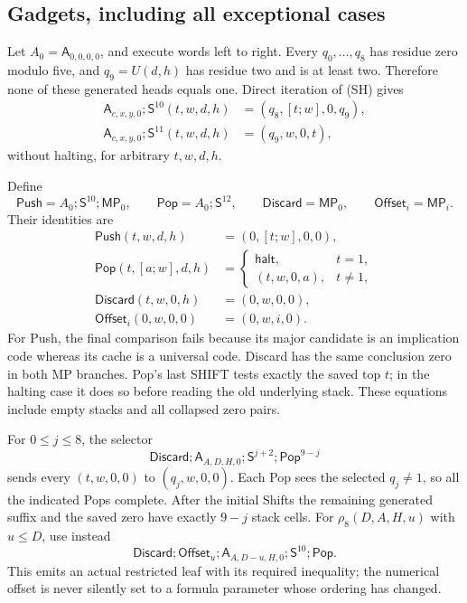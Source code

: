 \subsection{Gadgets, including all exceptional cases}

Let $A_0=\mathsf A_{0,0,0,0}$, and execute words left to right.
Every $q_0,\ldots,q_8$ has residue zero modulo five, and
$q_9=U(d,h)$ has residue two and is at least two.  Therefore none of
these generated heads equals one.  Direct iteration of (SH) gives
\begin{align*}
 \mathsf A_{c,x,y,0};\mathsf S^{10}(t,w,d,h)
     &=(q_8,[t;w],0,q_9),\\
 \mathsf A_{c,x,y,0};\mathsf S^{11}(t,w,d,h)
     &=(q_9,w,0,t),
\end{align*}
without halting, for arbitrary $t,w,d,h$.

Define
\[
 \mathsf{Push}=A_0;\mathsf S^{10};\mathsf{MP}_0,
 \qquad \mathsf{Pop}=A_0;\mathsf S^{12},
 \qquad \mathsf{Discard}=\mathsf{MP}_0,
 \qquad \mathsf{Offset}_i=\mathsf{MP}_i.
\]
Their identities are
\begin{align*}
 \mathsf{Push}(t,w,d,h)&=(0,[t;w],0,0),\\
 \mathsf{Pop}(t,[a;w],d,h)&=
  \begin{cases}\mathsf{halt},&t=1,\\(t,w,0,a),&t\ne1,\end{cases}\\
 \mathsf{Discard}(t,w,0,h)&=(0,w,0,0),\\
 \mathsf{Offset}_i(0,w,0,0)&=(0,w,i,0).
\end{align*}
For Push, the final comparison fails because its major candidate is an
implication code whereas its cache is a universal code.  Discard has
the same conclusion zero in both MP branches.  Pop's last SHIFT tests
exactly the saved top $t$; in the halting case it does so before reading
the old underlying stack.  These equations include empty stacks and
all collapsed zero pairs.

For $0\leq j\leq8$, the selector
\[
 \mathsf{Discard};\mathsf A_{A,D,H,0};
 \mathsf S^{j+2};\mathsf{Pop}^{9-j}
 \tag{SEL11H}
\]
sends every $(t,w,0,0)$ to $(q_j,w,0,0)$.
Each Pop sees the selected $q_j\ne1$, so all the indicated Pops
complete.  After the initial Shifts the remaining generated suffix
and the saved zero have exactly $9-j$ stack cells.  For
$\rho_8(D,A,H,u)$ with $u\leq D$, use instead
\[
 \mathsf{Discard};\mathsf{Offset}_u;
 \mathsf A_{A,D-u,H,0};\mathsf S^{10};\mathsf{Pop}.
\]
This emits an actual restricted leaf with its required inequality;
the numerical offset is never silently set to a formula parameter
whose ordering has changed.

